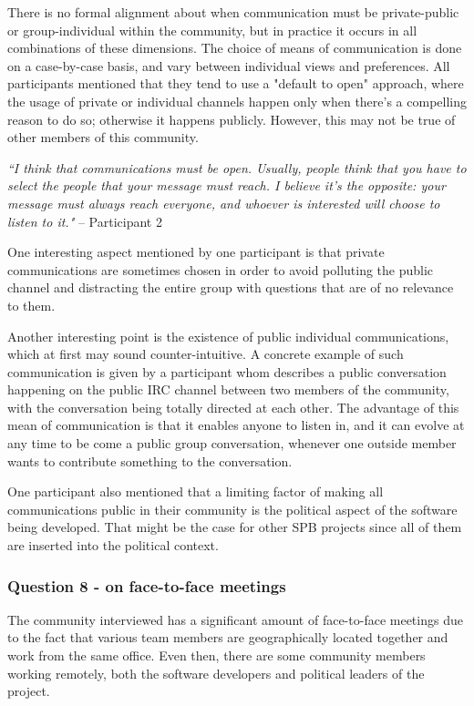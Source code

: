 \documentclass{sigchi}
\begin{document}
There is no formal alignment about when communication must be private-public or group-individual within the community, but in practice it occurs in all combinations of these dimensions. The choice of means of communication is done on a case-by-case basis, and vary between individual views and preferences. All participants mentioned that they tend to use a "default to open" approach, where the usage of private or individual channels happen only when there's a compelling reason to do so; otherwise it happens publicly. However, this may not be true of other members of this community.

\begin{displayquote}
\textit{``I think that communications must be open. Usually, people think that you have to select the people that your message must reach. I believe it's the opposite: your message must always reach everyone, and whoever is interested will choose to listen to it."} – Participant 2
\end{displayquote}

One interesting aspect mentioned by one participant is that private communications are sometimes chosen in order to avoid polluting the public channel and distracting the entire group with questions that are of no relevance to them.

Another interesting point is the existence of public individual communications, which at first may sound counter-intuitive. A concrete example of such communication is given by a participant whom describes a public conversation happening on the public IRC channel between two members of the community, with the conversation being totally directed at each other. The advantage of this mean of communication is that it enables anyone to listen in, and it can evolve at any time to be come a public group conversation, whenever one outside member wants to contribute something to the conversation.

One participant also mentioned that a limiting factor of making all communications public in their community is the political aspect of the software being developed. That might be the case for other SPB projects since all of them are inserted into the political context.

\subsubsection{Question 8 - on face-to-face meetings}

The community interviewed has a significant amount of face-to-face meetings due to the fact that various team members are geographically located together and work from the same office. Even then, there are some community members working remotely, both the software developers and political leaders of the project.
\end{document}
